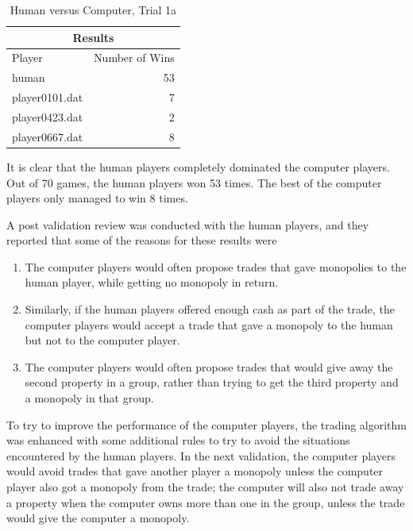 \begin{table}[htbp]
  \centering
  \caption{Human versus Computer, Trial 1a}
    \begin{tabular}{lr}
    \toprule
    \multicolumn{2}{c}{Results}\\
    \midrule
    Player  & Number of Wins \\
    \multicolumn{1}{l}{human}          & 53 \\
    \multicolumn{1}{l}{player0101.dat} &  7 \\
    \multicolumn{1}{l}{player0423.dat} &  2 \\
    \multicolumn{1}{l}{player0667.dat} &  8 \\
    \bottomrule
    \end{tabular}%
  \label{tab:human_results1a}%
\end{table}%
 
It is clear that the human players completely dominated the computer players.
Out of 70 games, the human players won 53 times. The best of the computer
players only managed to win 8 times.

A post validation review was conducted with the human players, and they reported
that some of the reasons for these results were
\begin{enumerate}
  \item {The computer players would often propose trades that gave monopolies to 
  the human player, while getting no monopoly in return.} 
  \item {Similarly, if the human players offered enough cash as part of the 
  trade, the computer players would accept a trade that gave a monopoly to the 
  human but not to the computer player.} 
  \item {The computer players would often propose trades that would give away 
  the second property in a group, rather than trying to get the third property 
  and a monopoly in that group.}
\end{enumerate}
To try to improve the performance of the computer players, the trading algorithm 
was enhanced with some additional rules to try to avoid the situations 
encountered by the human players. In the next validation, the computer players
would avoid trades that gave another player a monopoly unless the computer 
player also got a monopoly from the trade; the computer will also not trade away
a property when the computer owns more than one in the group, unless the trade
would give the computer a monopoly.

